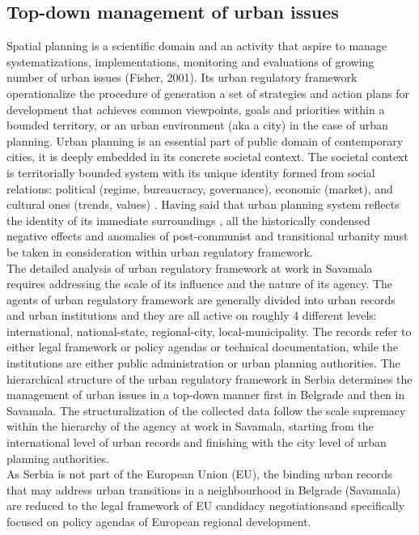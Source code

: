 \documentclass[11pt]{report}
\begin{document}
\subsection{Top-down management of urban issues}
Spatial planning is a scientific domain and an activity that aspire to manage systematizations, implementations, monitoring and evaluations of growing number of urban issues (Fisher, 2001). Its urban regulatory framework operationalize the procedure of generation a set of strategies and action plans for development that achieves common viewpoints, goals and priorities within a bounded territory, or an urban environment (aka a city) in the case of urban planning.
Urban planning is an essential part of public domain of contemporary cities, it is deeply embedded in its concrete societal context. The societal context is territorially bounded system with its unique identity formed from social relations: political (regime, bureaucracy, governance), economic (market), and cultural ones (trends, values) \cite{Vujosevic and Nedovic Budic 2006}.
Having said that urban planning system reflects the identity of its immediate surroundings \cite{(Stojkov and Dobricic 2012, Arbter 2001)}, all the historically condensed negative effects and anomalies of post-communist and transitional urbanity must be taken in consideration within urban regulatory framework.
\\
The detailed analysis of urban regulatory framework at work in Savamala requires addressing the scale of its influence and the nature of its agency. The agents of urban regulatory framework are generally divided into urban records and urban institutions and they are all active on roughly 4 different levels: international, national-state, regional-city, local-municipality.
The records refer to either legal framework or policy agendas or technical documentation, while the institutions are either public administration or urban planning authorities.
The hierarchical structure of the urban regulatory framework in Serbia determines the management of urban issues in a top-down manner first in Belgrade and then in Savamala.
The structuralization of the collected data follow the scale supremacy within the hierarchy of the agency at work in Savamala, starting from the international level of urban records and finishing with the city level of urban planning authorities.
\\
As Serbia is not part of the European Union (EU), the binding urban records that may address urban transitions in a neighbourhood in Belgrade (Savamala) are reduced to the legal framework of EU candidacy negotiations\footnotemark and specifically focused on policy agendas of European regional development.
\end{document}
